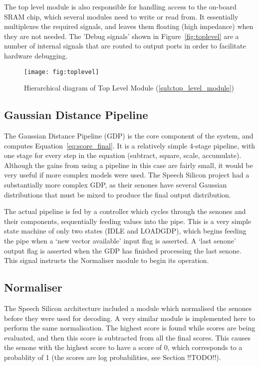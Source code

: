 		The top level module is also responsible for handling access to the on-board SRAM chip, which several modules need to write or read from.  It essentially multiplexes the required signals, and leaves them floating (high impedance) when they are not needed.  The 'Debug signals' shown in Figure~\ref{fig:toplevel} are a number of internal signals that are routed to output ports in order to facilitate hardware debugging.

		\begin{figure}[tb]
			\begin{center}
				\texttt{[image: fig:toplevel]}
			\end{center}
			\caption{Hierarchical diagram of Top Level Module (\ref{sub:top_level_module})}
			\label{fig:figure1}
		\end{figure}

	\subsection{Gaussian Distance Pipeline} %
	\label{sub:gaussian_distance_pipeline}
		The Gaussian Distance Pipeline (GDP) is the core component of the system, and computes Equation~\ref{eq:score_final}.  It is a relatively simple 4-stage pipeline, with one stage for every step in the equation (subtract, square, scale, accumulate).  Although the gains from using a pipeline in this case are fairly small, it would be very useful if more complex models were used.  The Speech Silicon \cite{schuster2006speech} project had a substantially more complex GDP, as their senones have several Gaussian distributions that must be mixed to produce the final output distribution.

		The actual pipeline is fed by a controller which cycles through the senones and their components, sequentially feeding values into the pipe.  This is a very simple state machine of only two states (IDLE and LOADGDP), which begins feeding the pipe when a `new vector available' input flag is asserted.  A `last senone' output flag is asserted when the GDP has finished processing the last senone.  This signal instructs the Normaliser module to begin its operation.

	\subsection{Normaliser} %
	\label{sub:normaliser}
		The Speech Silicon architecture included a module which normalised the senones before they were used for decoding.  A very similar module is implemented here to perform the same normalisation.  The highest score is found while scores are being evaluated, and then this score is subtracted from all the final scores.  This causes the senone with the highest score to have a score of 0, which corresponds to a probablity of 1 (the scores are log probabilities, see Section !!TODO!!).

